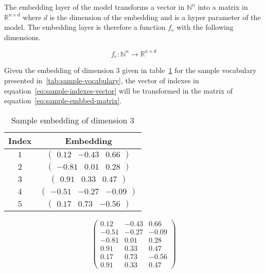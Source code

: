 The embedding layer of the model transforms a vector in $\mathbb{N}^n$ into a
matrix in $\mathbb{R}^{n\times d}$ where $d$ is the dimension of the embedding
and is a hyper parameter of the model. The embedding layer is therefore a
function $f_e$ with the following dimensions.

\begin{equation}
  f_e : \mathbb{N}^n \rightarrow \mathbb{R}^{n\times d}
\end{equation}

Given the embedding of dimension $3$ given in table~\ref{tab:sample-embedding}
for the sample vocabulary presented in~\ref{tab:sample-vocabulary}, the vector
of indexes in equation~\ref{eq:sample-indexes-vector} will be transformed in the
matrix of equation~\ref{eq:sample-embbed-matrix}.

\begin{table}
  \centering
  \begin{tabular}{cc}
    Index & Embedding\\
    \toprule
    $1$ & $\begin{pmatrix}0.12 & -0.43 & 0.66\end{pmatrix}$\\
    $2$ & $\begin{pmatrix}-0.81 & 0.01 & 0.28\end{pmatrix}$\\
    $3$ & $\begin{pmatrix}0.91 & 0.33 & 0.47\end{pmatrix}$\\
    $4$ & $\begin{pmatrix}-0.51 & -0.27 & -0.09\end{pmatrix}$\\
    $5$ & $\begin{pmatrix}0.17 & 0.73 & -0.56\end{pmatrix}$\\
  \end{tabular}
  \caption{\label{tab:sample-embedding} Sample embedding of dimension $3$}
\end{table}

\begin{equation}
  \label{eq:sample-embbed-matrix}
  \begin{pmatrix}
    0.12 & -0.43 & 0.66\\
    -0.51 & -0.27 & -0.09\\
    -0.81 & 0.01 & 0.28\\
    0.91 & 0.33 & 0.47\\
    0.17 & 0.73 & -0.56\\
    0.91 & 0.33 & 0.47
  \end{pmatrix}
\end{equation}

